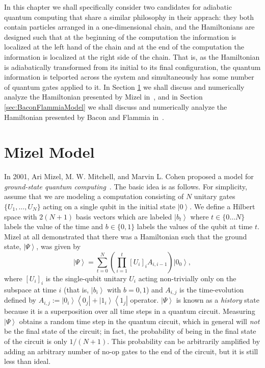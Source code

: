 \documentclass[12pt]{amsbook}
\theoremstyle{plain}
\theoremstyle{definition}
\theoremstyle{remark}
\newcommand{\ket}[1]{\left|#1\right>}
\newcommand{\bra}[1]{\left<#1\right|}
\newcommand{\ketbra}[2]{\ket{#1}\!\!\bra{#2}}
\newcommand{\paren}[1]{\left(#1\right)}
\begin{document}
In this chapter we shall specifically consider two candidates for adiabatic quantum computing that share a similar philosophy in their apprach:  they both contain particles arranged in a one-dimensional chain, and the Hamiltonians are designed such that at the beginning of the computation the information is localized at the left hand of the chain and at the end of the computation the information is localized at the right side of the chain.  That is, as the Hamiltonian is adiabatically transformed from its initial to its final configuration, the quantum information is telported across the system and simultaneously has some number of quantum gates applied to it.  In Section \ref{sec:MizelModel} we shall discuss and numerically analyze the Hamiltonian presented by Mizel in~\cite{Mizel2010}, and in Section \ref{sec:BaconFlammiaModel} we shall discuss and numerically analyze the Hamiltonian presented by Bacon and Flammia in~\cite{Bacon2009}.
\section{Mizel Model}
\label{sec:MizelModel}

In 2001, Ari Mizel, M. W. Mitchell, and Marvin L. Cohen proposed a model for \emph{ground-state quantum computing}~\cite{PhysRevA.63.040302}.  The basic idea is as follows.  For simplicity, assume that we are modeling a computation consisting of $N$ unitary gates $\{U_1,\dots,U_N\}$ acting on a single qubit in the initial state $\ket{0}$.  We define a Hilbert space with $2(N+1)$ basis vectors which are labeled $\ket{b_t}$ where $t\in\{0\dots N\}$ labels the value of the time and $b\in\{0,1\}$ labels the values of the qubit at time $t$.  Mizel at all demonstrated that there was a Hamiltonian such that the ground state, $\ket{\Psi}$, was given by $$\ket{\Psi}=\sum_{t=0}^N \paren{\prod_{i=1}^{t}[U_i]_i A_{i,i-1}}\ket{0_0},$$ where $[U_i]_i$ is the single-qubit unitary $U_i$ acting non-trivially only on the subspace at time $i$ (that is, $\ket{b_i}$ with $b=0,1$) and $A_{i,j}$ is the time-evolution defined by $A_{i,j} := \ketbra{0_i}{0_j} + \ketbra{1_i}{1_j}$ operator.  $\ket{\Psi}$ is known as a \emph{history} state because it is a superposition over all time steps in a quantum circuit.  Measuring $\ket{\Psi}$ obtains a random time step in the quantum circuit, which in general will \emph{not} be the final state of the circuit;  in fact, the probability of being in the final state of the circuit is only $1/(N+1)$.  This probability can be arbitrarily amplified by adding an arbitrary number of no-op gates to the end of the circuit, but it is still less than ideal.
\end{document}
